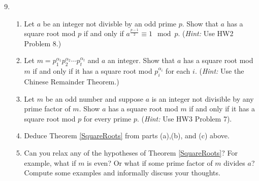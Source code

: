 \documentclass[11pt]{article}
\begin{document}
\begin{enumerate}
  \setcounter{enumi}{8}
  \item{
  \begin{enumerate}
    \item{
    Let $a$ be an integer not divisble by an odd prime $p$.  Show that $a$ has a square root mod $p$ if and only if $a^{\frac{p-1}{2}}\equiv 1\mod p$. (\textit{Hint:} Use HW2 Problem 8.)
    }
    \item{
    Let $m = p_1^{\alpha_1}p_2^{\alpha_2}\cdots p_t^{\alpha_t}$ and $a$ an integer.  Show that $a$ has a square root mod $m$ if and only if it has a square root mod $p_i^{\alpha_i}$ for each $i$. (\textit{Hint:} Use the Chinese Remainder Theorem.)
    }
    \item{
    Let $m$ be an odd number and suppose $a$ is an integer not divisible by any prime factor of $m$.  Show $a$ has a square root mod $m$ if and only if it has a square root mod $p$ for every prime $p$. (\textit{Hint:} Use HW3 Problem 7).
    }
    \item{
    Deduce Theorem \ref{SquareRoots} from parts (a),(b), and (c) above.
    }
    \item{
    Can you relax any of the hypotheses of Theorem \ref{SquareRoots}?  For example, what if $m$ is even?  Or what if some prime factor of $m$ divides $a$?  Compute some examples and informally discuss your thoughts.
    }
  \end{enumerate}
  }
\end{enumerate}
\end{document}
